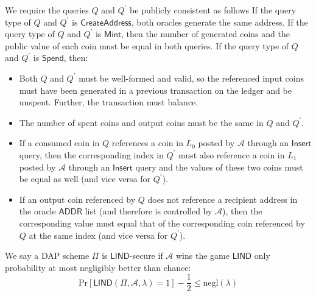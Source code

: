 \documentclass{llncs}
\newcommand{\func}[1]{\mathsf{#1}}
\begin{document}
We require the queries $Q$ and $Q^\prime$ be publicly consistent as follows
If the query type of $Q$ and $Q^\prime$ is $\func{CreateAddress}$, both oracles generate the same address.
If the query type of $Q$ and $Q^\prime$ is $\func{Mint}$, then the number of generated coins and the public value of each coin must be equal in both queries.
If the query type of $Q$ and $Q^\prime$ is $\func{Spend}$, then:
\begin{itemize}
    \item Both $Q$ and $Q^\prime$ must be well-formed and valid, so the referenced input coins must have been generated in a previous transaction on the ledger and be unspent.
    Further, the transaction must balance.
    \item The number of spent coins and output coins must be the same in $Q$ and $Q^\prime$.
    \item If a consumed coin in $Q$ references a coin in $L_0$ posted by $\mathcal{A}$ through an $\func{Insert}$ query, then the corresponding index in $Q^\prime$ must also reference a coin in $L_1$ posted by $\mathcal{A}$ through an $\func{Insert}$ query and the values of these two coins must be equal as well (and vice versa for $Q^\prime$). 
    \item If an output coin referenced by $Q$ does not reference a recipient address in the oracle $\func{ADDR}$ list (and therefore is controlled by $\mathcal{A}$), then the corresponding value must equal that of the corresponding coin referenced by $Q$ at the same index (and vice versa for $Q^\prime$).
\end{itemize}

We say a DAP scheme $\Pi$ is $\func{LIND}$-secure if $\mathcal{A}$ wins the game $\func{LIND}$ only probability at most negligibly better than chance:
$$\text{Pr}[\func{LIND}(\Pi, \mathcal{A}, \lambda) = 1] - \frac{1}{2} \leq \text{negl}(\lambda)$$
\end{document}
